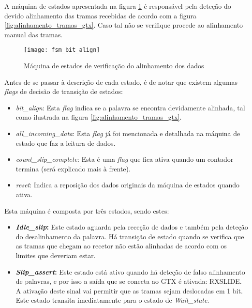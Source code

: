 \begin{enumerate}
	A máquina de estados apresentada na figura \ref{fig:fsm3} é responsável pela deteção do devido alinhamento das tramas recebidas de acordo com a figura \ref{fig:alinhamento_tramas_gtx}. Caso tal não se verifique procede ao alinhamento manual das tramas.
	
		\begin{figure}[h!]
			\begin{center}
				\leavevmode
				\texttt{[image: fsm\_bit\_align]}
				\captionsetup{width=1.0\linewidth}
				\caption[Máquina de estados de verificação do alinhamento dos dados]{Máquina de estados de verificação do alinhamento dos dados}
				\label{fig:fsm3}
		\end{center}
	\end{figure}
	
	Antes de se passar à descrição de cada estado, é de notar que existem algumas \textit{flags} de decisão de transição de estados:
	\begin{itemize}
		\item \textit{bit\_align}: Esta \textit{flag} indica se a palavra se encontra devidamente alinhada, tal como ilustrada na figura \ref{fig:alinhamento_tramas_gtx}. 
		
		\item \textit{all\_incoming\_data}: Esta \textit{flag} já foi mencionada e detalhada na máquina de estado que faz a leitura de dados.
		
		\item \textit{count\_slip\_complete}: Esta é uma \textit{flag} que fica ativa quando um contador termina (será explicado mais à frente).
		
		\item \textit{reset}: Indica a reposição dos dados originais da máquina de estados quando ativa.
	\end{itemize}
	
	
	Esta máquina é composta por três estados, sendo estes:
	\begin{itemize}
		\item \textbf{\textit{Idle\_slip}:} Este estado aguarda pela receção de dados e também pela deteção do desalinhamento da palavra. Há transição de estado quando se verifica que as tramas que chegam ao recetor não estão alinhadas de acordo com os limites que deveriam estar.
		
		\item \textbf{\textit{Slip\_assert}:} Este estado está ativo quando há deteção de falso alinhamento de palavras, e por isso a saída que se conecta ao GTX é ativada: RXSLIDE. A ativação deste sinal vai permitir que as tramas sejam deslocadas em 1 bit. Este estado transita imediatamente para o estado de \textit{Wait\_state}.
		

\end{itemize}
\end{enumerate}

